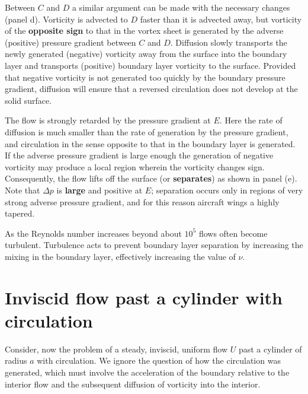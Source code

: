 \documentclass[10pt]{report}
\begin{document}
Between $C$ and $D$ a similar argument can be made with the necessary changes (panel d).
Vorticity is
advected to $D$ faster than it is advected away, but vorticity of the
\textbf{opposite sign} to that in the vortex sheet is generated by the
adverse (positive) pressure gradient between $C$ and $D$. Diffusion slowly
transports the newly generated (negative) vorticity away from the surface
into the boundary layer and transports (positive) boundary layer vorticity
to the surface. Provided that negative vorticity is not generated too
quickly by the boundary pressure gradient, diffusion will ensure that a
reversed circulation does not develop at the solid surface.

The flow is strongly retarded by the pressure gradient at $E$. Here the rate
of diffusion is much smaller than the rate of generation by the pressure
gradient, and circulation in the sense opposite to that in the boundary
layer is generated. If the adverse pressure gradient is large enough the
generation of negative vorticity may produce a local region wherein the
vorticity changes sign. Consequently, the flow lifts off the surface (or
\textbf{separates}) as shown in panel (e). Note that $\Delta p$ is \textbf{large} and
positive at $E$; separation occurs only in regions of very strong adverse
pressure gradient, and for this reason aircraft wings a highly tapered.

As the Reynolds number increases beyond about $10^{5}$ flows often become
turbulent. Turbulence acts to prevent boundary layer separation by
increasing the mixing in the boundary layer, effectively increasing the
value of $\nu $.

\section{Inviscid flow past a cylinder with circulation}
Consider, now the problem of a steady, inviscid, uniform flow $U$ past a
cylinder of radius $a $ with circulation. We ignore the question of how the
circulation was generated, which must involve the acceleration of the
boundary relative to the interior flow and the subsequent diffusion of
vorticity into the interior.
\end{document}
